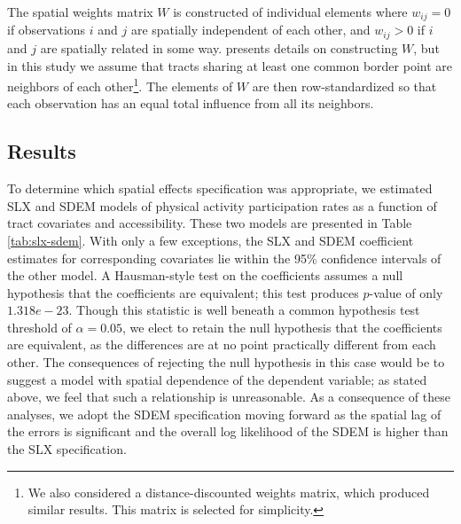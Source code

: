 \documentclass[shortAfour,sageh.bst]{sagej}
\begin{document}
The spatial weights matrix \(W\) is constructed of individual elements
where \(w_{ij} = 0\) if observations \(i\) and \(j\) are spatially
independent of each other, and \(w_{ij} > 0\) if \(i\) and \(j\) are
spatially related in some way. \citet{Dubin1998} presents details on
constructing \(W\), but in this study we assume that tracts sharing at
least one common border point are neighbors of each other\footnote{We
  also considered a distance-discounted weights matrix, which produced
  similar results. This matrix is selected for simplicity.}. The
elements of \(W\) are then row-standardized so that each observation has
an equal total influence from all its neighbors.

\hypertarget{results}{%
\subsection{Results}\label{results}}

To determine which spatial effects specification was appropriate, we
estimated SLX and SDEM models of physical activity participation rates
as a function of tract covariates and accessibility. These two models
are presented in Table \ref{tab:slx-sdem}. With only a few exceptions,
the SLX and SDEM coefficient estimates for corresponding covariates lie
within the 95\% confidence intervals of the other model. A Hausman-style
test \citep{Pace2008} on the coefficients assumes a null hypothesis that
the coefficients are equivalent; this test produces \(p\)-value of only
\(1.318e-23\). Though this statistic is well beneath a common hypothesis
test threshold of \(\alpha = 0.05\), we elect to retain the null
hypothesis that the coefficients are equivalent, as the differences are
at no point practically different from each other. The consequences of
rejecting the null hypothesis in this case would be to suggest a model
with spatial dependence of the dependent variable; as stated above, we
feel that such a relationship is unreasonable. As a consequence of these
analyses, we adopt the SDEM specification moving forward as the spatial
lag of the errors is significant and the overall log likelihood of the
SDEM is higher than the SLX specification.
\end{document}
